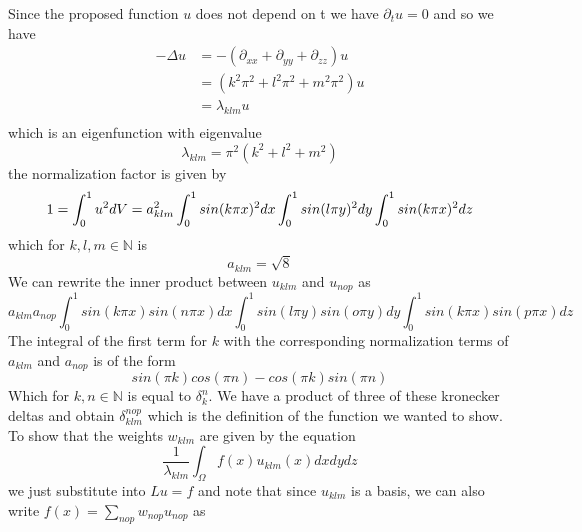 %
Since the proposed function $u$ does not depend on t we have $\partial_t u = 0$ and so we have 
\begin{align*}
    -\Delta u &=-(\partial_{xx}+\partial_{yy}+\partial_{zz})u\\
			  &= (k^2\pi^2+l^2\pi^2+m^2\pi^2)u\\
			  &= \lambda_{klm}u\\
\end{align*}
%
which is an eigenfunction with eigenvalue 
%
\begin{equation*}
    \lambda_{klm}=\pi^2(k^2+l^2+m^2)
\end{equation*}
%
the normalization factor is given by
%
\begin{equation*}
    1=\int_0^1 u^2 dV 
	 = a_{klm}^2\int_0^1 sin(k\pi x)^2 dx \int_0^1 sin(l\pi y)^2 dy \int_0^1 sin(k\pi x)^2 dz\\
\end{equation*}
%
which for $k,l,m \in \mathbb{N}$ is
%
\begin{equation}
         a_{klm}= \sqrt{8}
\end{equation}
%
We can rewrite the inner product between $u_{klm}$ and $u_{nop}$ as
%
\begin{equation}
a_{klm}a_{nop}\int_0^1 sin(k\pi x)sin(n\pi x) dx \int_0^1 sin(l\pi y)sin(o\pi y) dy \int_0^1 sin(k\pi x)sin(p\pi x) dz
\end{equation}
%
The integral of the first term for $k$ with the corresponding normalization terms of $a_{klm}$ and $a_{nop}$ is of the form 
%
\begin{equation}
	sin(\pi k) cos(\pi n) - cos(\pi k) sin(\pi n)
\end{equation}
%
Which for $k,n \in \mathbb{N}$ is equal to $\delta_k^n$. We have a product of three of these kronecker deltas and obtain $\delta_{klm}^{nop}$ which is the definition of the function we wanted to show.
%
To show that the weights $w_{klm}$ are given by the equation
%
\begin{equation}
    \frac{1}{\lambda_{klm}} \int_\Omega f(x)u_{klm}(x)dxdydz
\end{equation}
%
we just substitute into $Lu=f$ and note that since $u_{klm}$ is a basis, we can also write $f(x)=\sum_{nop}w_{nop}u_{nop}$ as

